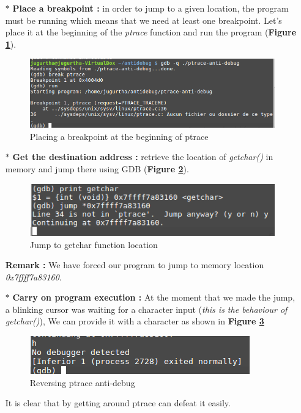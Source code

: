 \begin{itemize}
	\item[$\ast$] \textbf{Place a breakpoint :} in order to jump to a given location, the program must be running which means that we need at least one breakpoint. Let's place it at the beginning of the \emph{ptrace} function and run the program (\textbf{Figure \ref{Placing a breakpoint at the beginning of ptrace}}).
			\begin{figure}[H]
					\centering
        			\includegraphics[scale=0.5]{img/solution/ptrace-reverse-anti-debug.png}
        			\caption{Placing a breakpoint at the beginning of ptrace}
        			\label{Placing a breakpoint at the beginning of ptrace}
   			 \end{figure}
		
	
	\item[$\ast$] \textbf{Get the destination address : } retrieve the location of \emph{getchar()} in memory and jump there using GDB (\textbf{Figure \ref{Jump to getchar function location}}).
	\begin{figure}[H]
					\centering
        			\includegraphics[scale=0.5]{img/solution/jumpMadeUsingGDB.png}
        			\caption{Jump to getchar function location}
        			\label{Jump to getchar function location}
   			 \end{figure}
\textbf{\color{orange}Remark :} We have forced our program to jump to memory location \emph{0x7ffff7a83160}.	
	\item[$\ast$] \textbf{Carry on program execution : } At the moment that we made the jump, a blinking cursor was waiting for a character input (\emph{this is the behaviour of getchar()}), We can provide it with a character as shown in \textbf{Figure \ref{Reversing ptrace anti-debug}}
			\begin{figure}[H]
					\centering
        			\includegraphics[scale=0.55]{img/solution/reverse-engineering-debugged.png}
        			\caption{Reversing ptrace anti-debug}
        			\label{Reversing ptrace anti-debug}
   			 \end{figure}
	It is clear that by getting around ptrace can defeat it easily.
	
\end{itemize}






